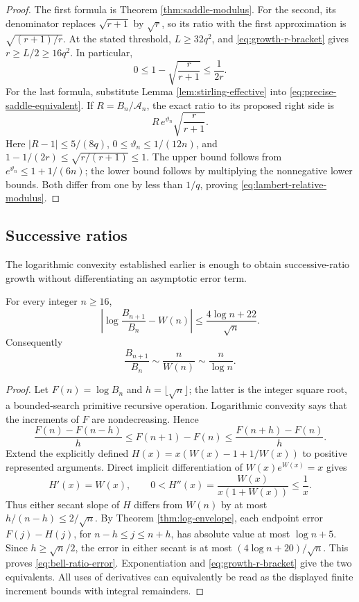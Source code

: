 \begin{proof}
The first formula is Theorem \ref{thm:saddle-modulus}.
For the second, its denominator replaces $\sqrt{r+1}$ by
$\sqrt r$, so its ratio with the first approximation is
$\sqrt{(r+1)/r}$.  At the stated threshold,
$L\geq32q^2$, and \eqref{eq:growth-r-bracket} gives
$r\geq L/2\geq16q^2$.  In particular,
\[
 0\leq1-\sqrt{\frac r{r+1}}\leq\frac1{2r}.
\]
For the last formula, substitute Lemma
\ref{lem:stirling-effective} into
\eqref{eq:precise-saddle-equivalent}.  If $R=B_n/\mathcal A_n$,
the exact ratio to its proposed right side is
\[
 R\,e^{\vartheta_n}\sqrt{\frac r{r+1}}.
\]
Here $|R-1|\leq5/(8q)$, $0\leq\vartheta_n\leq1/(12n)$, and
$1-1/(2r)\leq\sqrt{r/(r+1)}\leq1$.  The upper bound follows from
$e^{\vartheta_n}\leq1+1/(6n)$; the lower bound follows by
multiplying the nonnegative lower bounds.  Both differ from one by
less than $1/q$, proving \eqref{eq:lambert-relative-modulus}.
\end{proof}

\subsection{Successive ratios}

The logarithmic convexity established earlier is enough to obtain
successive-ratio growth without differentiating an asymptotic error
term.

\begin{corollary}\label{cor:bell-ratio}
For every integer $n\geq16$,
\begin{equation}\label{eq:bell-ratio-error}
 \left|\log\frac{B_{n+1}}{B_n}-W(n)\right|
 \leq\frac{4\log n+22}{\sqrt n}.
\end{equation}
Consequently
\[
 \frac{B_{n+1}}{B_n}\sim\frac n{W(n)}\sim\frac n{\log n}.
\]
\end{corollary}

\begin{proof}
Let $F(n)=\log B_n$ and $h=\lfloor\sqrt n\rfloor$; the latter is
the integer square root, a bounded-search primitive recursive
operation.  Logarithmic convexity says that the increments of $F$
are nondecreasing.  Hence
\[
 \frac{F(n)-F(n-h)}h\leq F(n+1)-F(n)
 \leq\frac{F(n+h)-F(n)}h.
\]
Extend the explicitly defined $H(x)=x(W(x)-1+1/W(x))$ to positive
represented arguments.  Direct implicit differentiation of
$W(x)e^{W(x)}=x$ gives
\[
 H'(x)=W(x),\qquad
 0<H''(x)=\frac{W(x)}{x(1+W(x))}\leq\frac1x.
\]
Thus either secant slope of $H$ differs from $W(n)$ by at most
$h/(n-h)\leq2/\sqrt n$.  By
Theorem \ref{thm:log-envelope}, each endpoint error $F(j)-H(j)$,
for $n-h\leq j\leq n+h$, has absolute value at most
$\log n+5$.  Since $h\geq\sqrt n/2$, the error in either secant is
at most $(4\log n+20)/\sqrt n$.  This proves
\eqref{eq:bell-ratio-error}.  Exponentiation and
\eqref{eq:growth-r-bracket} give the two equivalents.
All uses of derivatives can equivalently be read as the displayed
finite increment bounds with integral remainders.
\end{proof}

